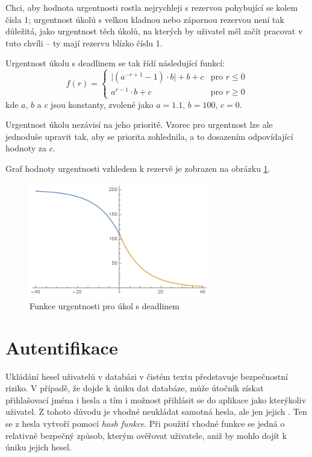 \documentclass[thesis=B,czech]{FITthesis}[2012/06/26]
\begin{document}
			Chci, aby hodnota urgentnosti rostla nejrychleji s rezervou pohybující se kolem čísla 1; urgentnost úkolů s velkou kladnou nebo zápornou rezervou není tak důležitá, jako urgentnost těch úkolů, na kterých by uživatel měl začít pracovat v tuto chvíli -- ty mají rezervu blízko číslu 1. 
			
			Urgentnost úkolu s deadlinem se tak řídí následující funkcí:
				\begin{equation}
				f(r)=
				\begin{cases}
					\lvert(a^{-r+1}-1)\cdot b \rvert +b+c& \text{pro } r\leq 0 \\
					a^{r-1}\cdot b + c& \text{pro } r\geq 0
				\end{cases}
				\end{equation}
			kde $a$, $b$ a $c$ jsou konstanty, zvolené jako $a=1.1$, $b=100$, $c=0$.

			Urgentnost úkolu nezávisí na jeho prioritě. Vzorec pro urgentnost lze ale jednoduše upravit tak, aby se priorita zohlednila, a to dosazením odpovídající hodnoty za $c$.
			
			Graf hodnoty urgentnosti vzhledem k rezervě je zobrazen na obrázku \ref{urgency-plot}.
			
			\begin{figure}\centering
				\includegraphics[width=0.7\textwidth]{resources/urgency-plot.png}
				\caption[Urgentnost úkolu s deadlinem]{Funkce urgentnosti pro úkol s deadlinem}
				\label{urgency-plot}
			\end{figure}
			


	
	\section{Autentifikace}
		Ukládání hesel uživatelů v databázi v čistém textu představuje bezpečnostní riziko. V případě, že dojde k úniku dat databáze, může útočník získat přihlašovací jména i hesla a tím i možnost přihlásit se do aplikace jako kterýkoliv uživatel. Z tohoto důvodu je vhodné neukládat samotná hesla, ale jen jejich . Ten se z hesla vytvoří pomocí \textit{hash funkce}. \cite{hash-function} Při použití vhodné funkce se jedná o relativně bezpečný způsob, kterým ověřovat uživatele, aniž by mohlo dojít k úniku jejich hesel.
		
\end{document}
